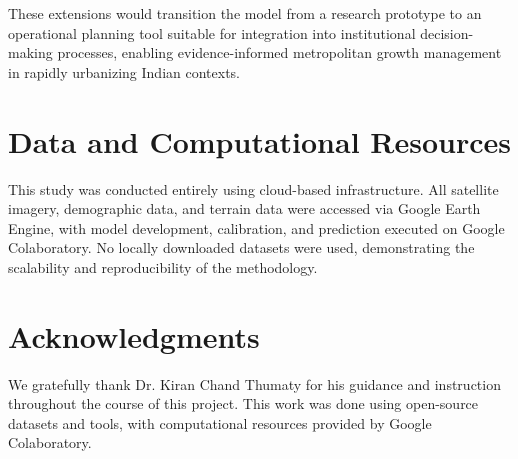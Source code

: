 \documentclass[conference]{IEEEtran}
\begin{document}
These extensions would transition the model from a research prototype to an operational planning tool suitable for integration into institutional decision-making processes, enabling evidence-informed metropolitan growth management in rapidly urbanizing Indian contexts.

\section*{Data and Computational Resources}
This study was conducted entirely using cloud-based infrastructure. All satellite imagery, demographic data, and terrain data were accessed via Google Earth Engine, with model development, calibration, and prediction executed on Google Colaboratory. No locally downloaded datasets were used, demonstrating the scalability and reproducibility of the methodology.

\section*{Acknowledgments}

We gratefully thank Dr. Kiran Chand Thumaty for his guidance and instruction throughout the course of this project. This work was done using open-source datasets and tools, with computational resources provided by Google Colaboratory.
\end{document}
